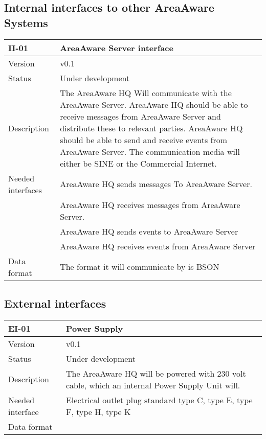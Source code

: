 \subsection{Internal interfaces to other AreaAware Systems}
\begin{longtable}{| p{3.5cm} |  p{10cm} | }
	\hline
	\textbf{II-01} &  \textbf{AreaAware Server interface } \\
	\hline
	Version & v0.1 \\
	\hline
	Status & Under development \\
	\hline
	Description & The AreaAware HQ Will communicate with the AreaAware Server. AreaAware HQ should be able to receive messages from AreaAware Server and distribute these to relevant parties. AreaAware HQ should be able to send and receive events from AreaAware Server. The communication media will either be SINE or the Commercial Internet. \\
	\hline
	 Needed interfaces & AreaAware HQ sends messages To AreaAware Server.  \\
				& AreaAware HQ receives messages from AreaAware Server. \\
				& AreaAware HQ sends events to AreaAware Server  \\
				& AreaAware HQ receives events from AreaAware Server  \\
	\hline
	Data format
	& The format it will communicate by is BSON \\
	\hline
\end{longtable}

\subsection{External interfaces}
\begin{longtable}{| p{3.5cm} | p{10cm} | }
	\hline
	\textbf{EI-01} &  \textbf{Power Supply} \\
	\hline
	Version & v0.1 \\
	\hline
	Status & Under development \\
	\hline
	Description & The AreaAware HQ will be powered with 230 volt cable, which an internal Power Supply Unit will.\\
	\hline
	Needed interface &  Electrical outlet plug standard type C, type E,  type F,  type H, type K \\
	\hline
	Data format
	&  \\
	\hline
\end{longtable}

